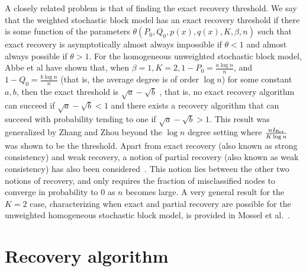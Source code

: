 \documentclass{article}
\begin{document}
A closely related problem is that of finding the exact recovery threshold. We say that the weighted stochastic block model has an exact recovery threshold if there is some function of the parameters $\theta(P_0, Q_0, p(x), q(x), K, \beta, n)$ such that exact recovery is asymptotically almost always impossible if $\theta < 1$ and almost always possible if $\theta > 1$. For the homogeneous unweighted stochastic block model, Abbe et al \cite{abbe2014exact} have shown that, when $\beta=1, K=2, 1 - P_0 = \frac{a \log n}{n}$, and $1 - Q_0 = \frac{b \log n}{n}$  (that is, the average degree is of order $\log n$) for some constant $a,b$, then the exact threshold is $\sqrt{a} - \sqrt{b}$ , that is, no exact recovery algorithm can succeed if $\sqrt{a} - \sqrt{b} < 1$ and there exists a recovery algorithm that can succeed with probability tending to one if $\sqrt{a} - \sqrt{b} > 1$.  This result was generalized by Zhang and Zhou \cite{zhangminimax} beyond the $\log n$ degree setting where $ \frac{n I_{\textrm{Ber}}}{K \log n}$ was shown to be the threshold. %
Apart from exact recovery (also known as strong consistency) and weak recovery, a notion of partial recovery (also known as weak consistency) has also been considered~\cite{MosEtal14, AminiEtal13, zhangminimax}. This notion lies between the other two notions of recovery, and only requires the fraction of misclassified nodes to converge in probability to 0 as $n$ becomes large. A very general result for the $K=2$ case, characterizing when exact and partial recovery are possible for the unweighted homogeneous stochastic block model, is provided in Mossel et al.~\cite{MosEtal14}.





\section{Recovery algorithm}
\label{sec:method}
\end{document}
